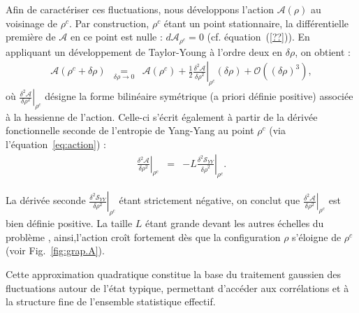 Afin de caractériser ces fluctuations, nous développons l’action \( \mathcal{A}(\rho) \) au voisinage de \( \rho^c \). Par construction, \( \rho^c \) étant un point stationnaire, la différentielle première de \( \mathcal{A} \) en ce point est nulle : \( d\mathcal{A}_{\rho^c} = 0 \) (cf. équation~(\ref{??})). En appliquant un développement de Taylor-Young à l’ordre deux en \( \delta \rho \), on obtient :
\begin{eqnarray}
	\mathcal{A}(\rho^c + \delta \rho) & \underset{ \delta \rho \to 0 }{=} & \mathcal{A}(\rho^c) + \frac{1}{2} \left. \frac{\delta^2 \mathcal{A}}{{\delta \rho}^2} \right|_{\rho^c} (\delta \rho) + \mathcal{O}((\delta \rho)^3),
\end{eqnarray}
où \( \left. \frac{\delta^2 \mathcal{A}}{\delta \rho^2} \right|_{\rho^c} \) désigne la forme bilinéaire symétrique (a priori définie positive) associée à la hessienne de l’action. Celle-ci s’écrit également à partir de la dérivée fonctionnelle seconde de l’entropie de Yang-Yang au point \( \rho^c \) (via l’équation~\eqref{eq:action}) :
\begin{eqnarray*}
	\left. \frac{\delta^2 \mathcal{A}}{\delta \rho^2} \right|_{\rho^c} &=& -L \left. \frac{\delta^2 \mathcal{S}_{YY}}{{\delta \rho}^2} \right|_{\rho^c}.
\end{eqnarray*}

La dérivée seconde \( \left. \frac{\delta^2 \mathcal{S}_{YY}}{\delta \rho^2} \right|_{\rho^c} \) étant strictement négative, on conclut que \( \left. \frac{\delta^2 \mathcal{A}}{\delta \rho^2} \right|_{\rho^c} \) est bien définie positive. La taille \( L \) étant grande devant les autres échelles du problème , ainsi,l’action croît fortement dès que la configuration \( \rho \) s’éloigne de \( \rho^c \) (voir Fig.~\ref{fig:grap.A}).

Cette approximation quadratique constitue la base du traitement gaussien des fluctuations autour de l’état typique, permettant d’accéder aux corrélations et à la structure fine de l’ensemble statistique effectif.



